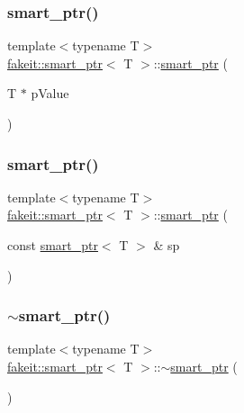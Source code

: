 \subsubsection{\texorpdfstring{smart\_ptr()}{smart\_ptr()}\hspace{0.1cm}{\footnotesize\ttfamily [11/27]}}
{\footnotesize\ttfamily template$<$typename T$>$ \\
\mbox{\hyperlink{classfakeit_1_1smart__ptr}{fakeit\+::smart\+\_\+ptr}}$<$ T $>$\+::\mbox{\hyperlink{classfakeit_1_1smart__ptr}{smart\+\_\+ptr}} (\begin{DoxyParamCaption}\item[{T $\ast$}]{p\+Value }\end{DoxyParamCaption})\hspace{0.3cm}{\ttfamily [inline]}}

\mbox{\label{classfakeit_1_1smart__ptr_a1157d28b4675e32ae90886871fb1b0bd}} 
\subsubsection{\texorpdfstring{smart\_ptr()}{smart\_ptr()}\hspace{0.1cm}{\footnotesize\ttfamily [12/27]}}
{\footnotesize\ttfamily template$<$typename T$>$ \\
\mbox{\hyperlink{classfakeit_1_1smart__ptr}{fakeit\+::smart\+\_\+ptr}}$<$ T $>$\+::\mbox{\hyperlink{classfakeit_1_1smart__ptr}{smart\+\_\+ptr}} (\begin{DoxyParamCaption}\item[{const \mbox{\hyperlink{classfakeit_1_1smart__ptr}{smart\+\_\+ptr}}$<$ T $>$ \&}]{sp }\end{DoxyParamCaption})\hspace{0.3cm}{\ttfamily [inline]}}

\mbox{\label{classfakeit_1_1smart__ptr_a0a184c081564a5a22d8ad0a121614bc5}} 
\subsubsection{\texorpdfstring{$\sim$smart\_ptr()}{~smart\_ptr()}\hspace{0.1cm}{\footnotesize\ttfamily [4/9]}}
{\footnotesize\ttfamily template$<$typename T$>$ \\
\mbox{\hyperlink{classfakeit_1_1smart__ptr}{fakeit\+::smart\+\_\+ptr}}$<$ T $>$\+::$\sim$\mbox{\hyperlink{classfakeit_1_1smart__ptr}{smart\+\_\+ptr}} (\begin{DoxyParamCaption}{ }\end{DoxyParamCaption})\hspace{0.3cm}{\ttfamily [inline]}}

